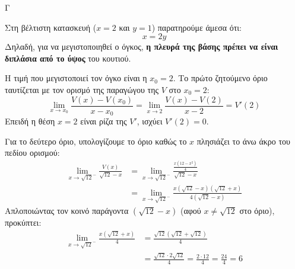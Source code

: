 \begin{thema}{Γ}
\begin{erwthma}
\item Στη βέλτιστη κατασκευή ($x=2$ και $y=1$) παρατηρούμε άμεσα ότι:
\[ x = 2y \]
Δηλαδή, για να μεγιστοποιηθεί ο όγκος, \textbf{η πλευρά της βάσης πρέπει να είναι διπλάσια από το ύψος} του κουτιού.

\item Η τιμή που μεγιστοποιεί τον όγκο είναι η $x_0 = 2$.
Το πρώτο ζητούμενο όριο ταυτίζεται με τον ορισμό της παραγώγου της $V$ στο $x_0 = 2$:
\[ \lim_{x \to x_0} \frac{V(x) - V(x_0)}{x-x_0} = \lim_{x \to 2} \frac{V(x) - V(2)}{x-2} = V'(2) \]
Επειδή η θέση $x=2$ είναι ρίζα της $V'$, ισχύει ${V'(2) = 0}$.

Για το δεύτερο όριο, υπολογίζουμε το όριο καθώς το $x$ πλησιάζει το άνω άκρο του πεδίου ορισμού:
\begin{align*}
\lim_{x \to \sqrt{12}^-} \frac{V(x)}{\sqrt{12}-x} &= \lim_{x \to \sqrt{12}^-} \frac{\frac{x(12-x^2)}{4}}{\sqrt{12}-x} \\
&= \lim_{x \to \sqrt{12}^-} \frac{x(\sqrt{12}-x)(\sqrt{12}+x)}{4(\sqrt{12}-x)}
\end{align*}
Απλοποιώντας τον κοινό παράγοντα $(\sqrt{12}-x)$ (αφού $x \neq \sqrt{12}$ στο όριο), προκύπτει:
\begin{align*}
\lim_{x \to \sqrt{12}^-} \frac{x(\sqrt{12}+x)}{4} &= \frac{\sqrt{12}(\sqrt{12}+\sqrt{12})}{4} \\
&= \frac{\sqrt{12} \cdot 2\sqrt{12}}{4} = \frac{2 \cdot 12}{4} = \frac{24}{4} = {6}
\end{align*}
\end{erwthma}
\end{thema}
